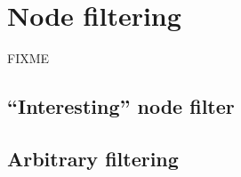 \section{Node filtering}

FIXME

\subsection{``Interesting'' node filter}
\label{interesting_node_filter}

\subsection{Arbitrary filtering}

